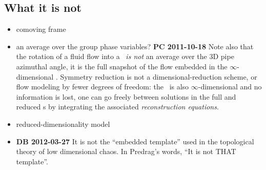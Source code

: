     \ifdraft\color{blue}
\subsection{What it is not}
    \begin{itemize}
      \item comoving frame
      \item an average over the group phase variables?
        {\bf PC 2011-10-18} Note also that the rotation of a fluid flow
        into a \slice\ {\em is not} an average over the 3D pipe azimuthal
        angle, it is the full snapshot of the flow embedded in the
        $\infty$-dimensional \statesp. Symmetry reduction is not a
        dimensional-reduction scheme, or flow modeling by fewer degrees
        of freedom: the \reducedsp\ is also $\infty$-dimensional and no
        information is lost, one can go freely between solutions in the
        full and reduced \statesp s by integrating the associated
        \emph{reconstruction equations}.
      \item reduced-dimensionality model
      \item {\bf DB 2012-03-27} It is not the ``embedded template'' used in the topological theory of
      low dimensional chaos. In Predrag's words, ``It is not THAT template''.
    \end{itemize}
    \color{black}\fi
